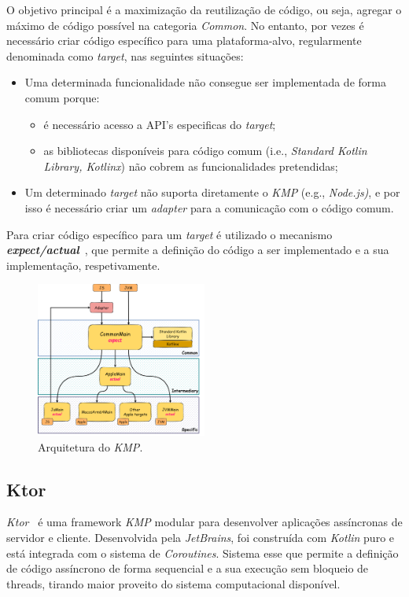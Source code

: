 O objetivo principal é a maximização da reutilização de código, ou seja, agregar o máximo de código possível na categoria \textit{Common}.
No entanto, por vezes é necessário criar código específico para uma plataforma-alvo, regularmente denominada como \textit{target}, nas seguintes situações:

\begin{itemize}[topsep=0pt,itemsep=0pt,partopsep=0pt, parsep=0pt]
    \item Uma determinada funcionalidade não consegue ser implementada de forma comum porque:
    \begin{itemize}[topsep=0pt,itemsep=0pt,partopsep=0pt, parsep=0pt]
        \item é necessário acesso a API's especificas do \textit{target};
        \item as bibliotecas disponíveis para código comum (i.e., \textit{Standard Kotlin Library, Kotlinx}) não cobrem as funcionalidades pretendidas;
    \end{itemize}
    \item Um determinado \textit{target} não suporta diretamente o \textit{KMP} (e.g., \textit{Node.js)}, e por isso é necessário criar um \textit{adapter} para a comunicação com o código comum.
\end{itemize}

Para criar código específico para um \textit{target} é utilizado o
mecanismo \textbf{\textit{expect/actual}}~\cite{kmp-expect-actual}, que permite a definição do código a ser implementado e a sua implementação, respetivamente.

\begin{figure}[H]
    \centering
    \includegraphics[width=0.5\textwidth]{../docs/imgs/kmp-architecture}
    \caption{Arquitetura do \textit{KMP}.}
    \label{fig:kmp-architecture}
\end{figure}

\subsection{Ktor}\label{subsec:ktor}

\textit{Ktor}~\cite{ktor} é uma framework \textit{KMP} modular para desenvolver aplicações assíncronas de
servidor e cliente. Desenvolvida pela \textit{JetBrains}, foi construída com \textit{Kotlin} puro e está integrada com o sistema de \textit{Coroutines}. Sistema esse que permite a definição de
código assíncrono de forma sequencial e a sua execução sem bloqueio de threads, tirando maior proveito do sistema computacional disponível.
